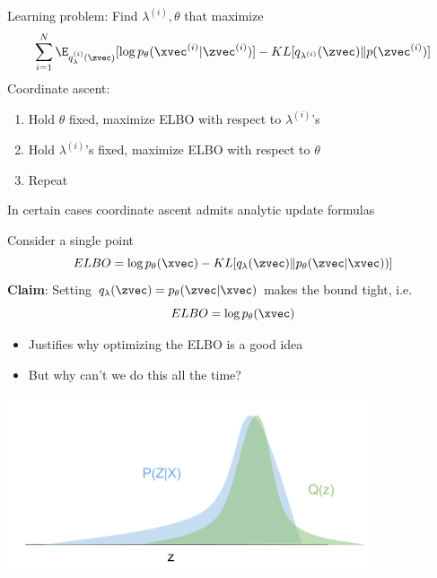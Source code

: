 \begin{frame}
  \begin{center}
   \end{center}   
   Learning problem: Find $\lambda^{(i)}, \theta$ that maximize 
\[ \sum_{i=1}^N \E_{q_\lambda^{(i)}(\zvec)}[\log  p_\theta(\xvec^{(i)} | \zvec^{(i)}) ] - KL[q_{\lambda^{(i)}}(\zvec) \Vert p(\zvec^{(i)})] \]
Coordinate ascent:
\begin{enumerate}
\item Hold $\theta$ fixed, maximize ELBO with respect to $\lambda^{(i)}$'s
\item Hold $\lambda^{(i)}$'s fixed, maximize ELBO with respect to $\theta$
\item Repeat
\end{enumerate}
In certain cases coordinate ascent admits analytic update formulas
\end{frame}

\begin{frame}
  \begin{center}
   \end{center}   
       Consider a single point
  \[ ELBO = \log p_\theta(\xvec)- KL[ q_\lambda(\zvec) \Vert p_\theta(\zvec | \xvec)) ]  \]
   \textbf{Claim}: Setting $q_\lambda(\zvec) = p_\theta(\zvec | \xvec)$ makes the bound tight, i.e.
     \[ ELBO = \log p_\theta(\xvec)  \]
     \begin{itemize}
  \item Justifies why optimizing the ELBO is a good idea
  \item But why can't we do this all the time?
  \end{itemize}
  \end{frame}
  
  \begin{frame}
  \begin{center}
   \end{center}   
   \center
\includegraphics[scale=0.7]{vi-gauss}
 \end{frame}

